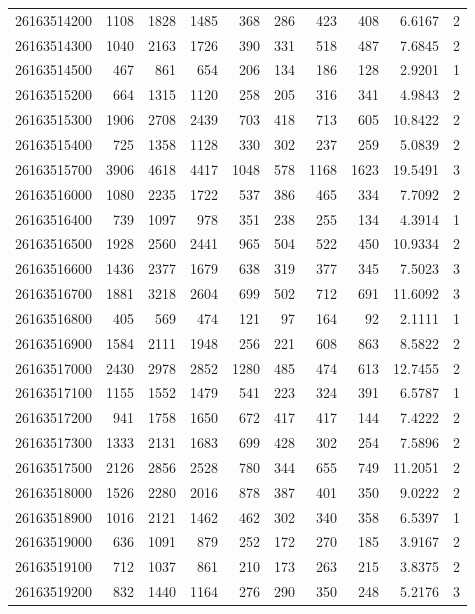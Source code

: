\documentclass[
  11pt,
]{article}
\begin{document}
\begin{longtable}[t]{lrrrrrrrrr}
26163514200 & 1108 & 1828 & 1485 & 368 & 286 & 423 & 408 & 6.6167 & 2\\
26163514300 & 1040 & 2163 & 1726 & 390 & 331 & 518 & 487 & 7.6845 & 2\\
26163514500 & 467 & 861 & 654 & 206 & 134 & 186 & 128 & 2.9201 & 1\\
26163515200 & 664 & 1315 & 1120 & 258 & 205 & 316 & 341 & 4.9843 & 2\\
26163515300 & 1906 & 2708 & 2439 & 703 & 418 & 713 & 605 & 10.8422 & 2\\
26163515400 & 725 & 1358 & 1128 & 330 & 302 & 237 & 259 & 5.0839 & 2\\
26163515700 & 3906 & 4618 & 4417 & 1048 & 578 & 1168 & 1623 & 19.5491 & 3\\
26163516000 & 1080 & 2235 & 1722 & 537 & 386 & 465 & 334 & 7.7092 & 2\\
26163516400 & 739 & 1097 & 978 & 351 & 238 & 255 & 134 & 4.3914 & 1\\
26163516500 & 1928 & 2560 & 2441 & 965 & 504 & 522 & 450 & 10.9334 & 2\\
26163516600 & 1436 & 2377 & 1679 & 638 & 319 & 377 & 345 & 7.5023 & 3\\
26163516700 & 1881 & 3218 & 2604 & 699 & 502 & 712 & 691 & 11.6092 & 3\\
26163516800 & 405 & 569 & 474 & 121 & 97 & 164 & 92 & 2.1111 & 1\\
26163516900 & 1584 & 2111 & 1948 & 256 & 221 & 608 & 863 & 8.5822 & 2\\
26163517000 & 2430 & 2978 & 2852 & 1280 & 485 & 474 & 613 & 12.7455 & 2\\
26163517100 & 1155 & 1552 & 1479 & 541 & 223 & 324 & 391 & 6.5787 & 1\\
26163517200 & 941 & 1758 & 1650 & 672 & 417 & 417 & 144 & 7.4222 & 2\\
26163517300 & 1333 & 2131 & 1683 & 699 & 428 & 302 & 254 & 7.5896 & 2\\
26163517500 & 2126 & 2856 & 2528 & 780 & 344 & 655 & 749 & 11.2051 & 2\\
26163518000 & 1526 & 2280 & 2016 & 878 & 387 & 401 & 350 & 9.0222 & 2\\
26163518900 & 1016 & 2121 & 1462 & 462 & 302 & 340 & 358 & 6.5397 & 1\\
26163519000 & 636 & 1091 & 879 & 252 & 172 & 270 & 185 & 3.9167 & 2\\
26163519100 & 712 & 1037 & 861 & 210 & 173 & 263 & 215 & 3.8375 & 2\\
26163519200 & 832 & 1440 & 1164 & 276 & 290 & 350 & 248 & 5.2176 & 3\\

\end{longtable}
\end{document}
